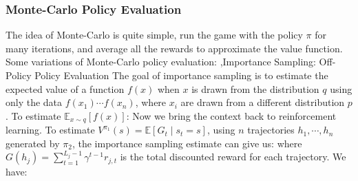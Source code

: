 \documentclass[10pt]{report}
\begin{document}
\subsubsection{Monte-Carlo Policy Evaluation}
The idea of Monte-Carlo is quite simple, run the game with the policy $\pi$ for many iterations, and average all the rewards to approximate
the value function.
Some variations of Monte-Carlo policy evaluation:
\sep{Importance Sampling: Off-Policy Policy Evaluation}
The goal of importance sampling is to estimate the expected value of a function $f(x)$ when $x$ is drawn from the distribution $q$ using only the data $f(x_1)\cdots f(x_n)$,
where $x_i$ are drawn from a different distribution $p$. To estimate $\mathbb{E}_{x\sim q}[f(x)]$:
Now we bring the context back to reinforcement learning. To estimate $V^{\pi_1}(s)=\mathbb{E}[G_t\mid s_t=s]$,
using $n$ trajectories $h_1,\cdots,h_n$ generated by $\pi_2$, the importance sampling estimate can give us:
where $G(h_j)=\sum_{t=1}^{L_j-1}\gamma^{t-1}r_{j,t}$ is the total discounted reward for each trajectory. We have:
\end{document}
